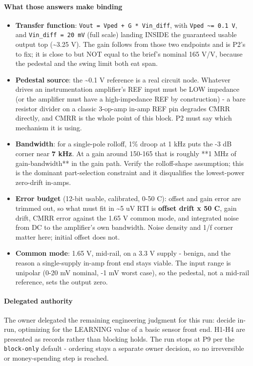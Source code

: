 \documentclass[11pt,a4paper]{article}
\begin{document}
\paragraph*{What those answers make binding}
\begin{itemize}
\item \textbf{Transfer function}: \texttt{Vout = Vped + G {*} Vin\_diff}, with \texttt{Vped \textasciitilde{}= 0.1 V}, and
\texttt{Vin\_diff = 20 mV} (full scale) landing INSIDE the guaranteed usable output
top (\textasciitilde{}3.25 V). The gain follows from those two endpoints and is P2's to fix;
it is close to but NOT equal to the brief's nominal 165 V/V, because the
pedestal and the swing limit both eat span.
\item \textbf{Pedestal source}: the \textasciitilde{}0.1 V reference is a real circuit node. Whatever
drives an instrumentation amplifier's REF input must be LOW impedance (or the
amplifier must have a high-impedance REF by construction) - a bare resistor
divider on a classic 3-op-amp in-amp REF pin degrades CMRR directly, and CMRR
is the whole point of this block. P2 must say which mechanism it is using.
\item \textbf{Bandwidth}: for a single-pole rolloff, 1\% droop at 1 kHz puts the -3 dB
corner near \textbf{7 kHz}. At a gain around 150-165 that is roughly {*}{*}1 MHz of
gain-bandwidth{*}{*} in the gain path. Verify the rolloff-shape assumption; this
is the dominant part-selection constraint and it disqualifies the lowest-power
zero-drift in-amps.
\item \textbf{Error budget} (12-bit usable, calibrated, 0-50 C): offset and gain error
are trimmed out, so what must fit in \textasciitilde{}5 uV RTI is \textbf{offset drift x 50 C},
gain drift, CMRR error against the 1.65 V common mode, and integrated noise
from DC to the amplifier's own bandwidth. Noise density and 1/f corner matter
here; initial offset does not.
\item \textbf{Common mode}: 1.65 V, mid-rail, on a 3.3 V supply - benign, and the reason
a single-supply in-amp front end stays viable. The input range is unipolar
(0-20 mV nominal, -1 mV worst case), so the pedestal, not a mid-rail
reference, sets the output zero.
\end{itemize}
\paragraph*{Delegated authority}
The owner delegated the remaining engineering judgment for this run: decide in-run, optimizing for the LEARNING value of a basic sensor front end. H1-H4 are presented as records rather than blocking holds. The run stops at P9 per the \texttt{block-only} default - ordering stays a separate owner decision, so no irreversible or money-spending step is reached.
\end{document}
